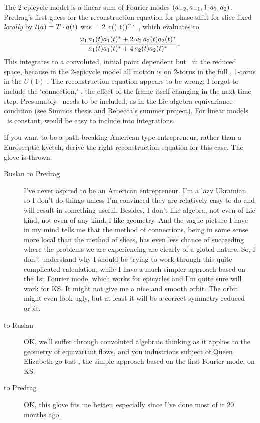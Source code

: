 The 2-epicycle model is a linear sum of Fourier modes
$(a_{-2},a_{-1},1,a_1,a_2)$.
Predrag's first guess for the reconstruction equation for
phase shift for slice fixed \emph{locally} by $t(a) =
T\cdot a(t)$ was
\beq
{}=
                        {2 \,t(\ssp) \cdot t(\ssp)^{*}}
\,,
which evaluates to
\[
\frac{\omega_1\, \ssp_1(t) \ssp_1(t)^{*}
  + 2\,\omega_2\, \ssp_2(t) \ssp_2(t)^{*}
     }{
               \ssp_1(t) \ssp_1(t)^{*}
  +         4\,  \ssp_2(t) \ssp_2(t)^{*}}
\,.
\]
This integrates to a convoluted, initial point dependent
but \po\ in the reduced
space, because in the 2-epicycle model all motion is on
2-torus in the full \statesp, 1-torus in the
$U(1)$-\reducedsp. The reconstruction equation
 appears to be wrong; I forgot to
include the `connection,' \ie, the effect of the frame itself
changing in the next time step. Presumably \stabmat\
needs to be included, as in the Lie algebra equivariance
condition
(see Siminos thesis and
     {Rebecca's summer project}).
For linear models \stabmat\ is constant, would be easy to
include into integrations.

If you want to be a path-breaking American type entrepreneur, rather
than a Eurosceptic kvetch, derive the right reconstruction equation
for this case. The glove is thrown.

\begin{description}
\item[Ruslan to Predrag]
I've never aspired to be an American entrepreneur.
I'm a lazy Ukrainian, so I don't do things unless I'm
convinced they are relatively easy to do and will result in
something useful.  Besides, I don't like algebra, not even of
Lie kind, not even of any kind.  I like geometry.  And the
vague picture I have in my mind tells me that the method of
connections, being in some sense more local than the method
of slices, has even less chance of succeeding where the
problems we are experiencing are clearly of a global nature.
So, I don't understand why I should be trying to work through
this quite complicated calculation, while I have a much
simpler approach based on the 1st Fourier mode, which works
for epicycles and I'm quite sure will work for KS.  It might
not give me a nice and smooth orbit.  The orbit might even
look ugly, but at least it will be a correct symmetry reduced
orbit.

\item[ to Ruslan]
OK, we'll suffer through
convoluted algebraic thinking as it applies to the geometry
of equivariant flows, and you industrious subject of Queen
Elizabeth go test , the simple approach based
on the first Fourier mode, on KS.

\item[ to Predrag]
OK, this glove fits me better, especially since I've done most of it 20 months ago.
\end{description}

